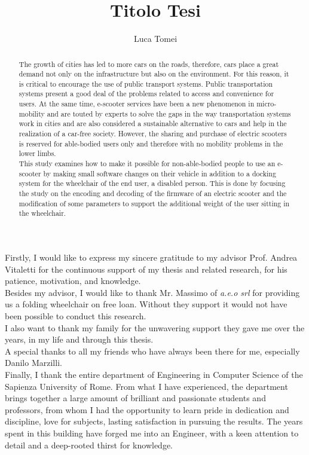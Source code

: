 \documentclass[binding=0.6cm,LaM,noexaminfo]{sapthesis}
\title{Titolo Tesi}
\author{Luca Tomei}
\begin{document}
\frontmatter
\maketitle

\begin{acknowledgments}
Firstly, I would like to express my sincere gratitude to my advisor Prof. Andrea Vitaletti for the continuous support of my thesis and related research, for his patience, motivation, and knowledge.\\
Besides my advisor, I would like to thank Mr. Massimo of \textit{a.e.o srl} for providing us a folding wheelchair on free loan. Without they support it would not have been possible to conduct this research.\\
I also want to thank my family for the unwavering support they gave me over the years, in my life and through this thesis.\\
A special thanks to all my friends who have always been there for me, especially Danilo Marzilli.\\
Finally, I thank the entire department of Engineering in Computer Science of the Sapienza University of Rome. From what I have experienced, the department brings together a large amount of brilliant and passionate students and professors, from whom I had the opportunity to learn pride in dedication and discipline, love for subjects, lasting satisfaction in pursuing the results. The years spent in this building have forged me into an Engineer, with a keen attention to detail and a deep-rooted thirst for knowledge.
\end{acknowledgments}

\begin{abstract}
The growth of cities has led to more cars on the roads, therefore, cars place a great demand not only on the infrastructure but also on the environment. For this reason, it is critical to encourage the use of public transport systems. Public transportation systems present a good deal of the problems related to access and convenience for users. At the same time, e-scooter services have been a new phenomenon in micro-mobility and are touted by experts to solve the gaps in the way transportation systems work in cities and are also considered a sustainable alternative to cars and help in the realization of a car-free society. However, the sharing and purchase of electric scooters is reserved for able-bodied users only and therefore with no mobility problems in the lower limbs.\\
This study examines how to make it possible for non-able-bodied people to use an e-scooter by making small software changes on their vehicle in addition to a docking system for the wheelchair of the end user, a disabled person. This is done by focusing the study on the encoding and decoding of the firmware of an electric scooter and the modification of some parameters to support the additional weight of the user sitting in the wheelchair.
\end{abstract}
\end{document}

